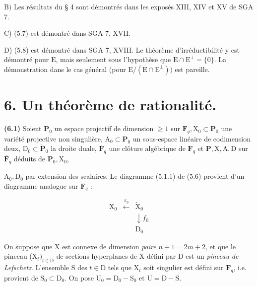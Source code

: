\documentclass[10pt,leqno]{article}
\begin{document}
\noindent \(\mathrm{B})\) Les résultats du § 4 sont démontrés dans les exposés XIII, XIV et XV de SGA 7.\par

\noindent C) (5.7) est démontré dans SGA 7, XVII.\par

\noindent D) (5.8) est démontré dans SGA 7, XVIII. Le théorème d’irréductibilité y est démontré pour \(\mathrm{E}\), mais seulement sous l’hypothèse que \(\mathrm{E}\cap \mathrm{E}^{\perp }=\{0\}\). La démonstration dans le cas général (pour \(\mathrm{E}/(\mathrm{E}\cap \mathrm{E}^{\perp }))\) est pareille.\par

\section*{6. Un théorème de rationalité.}

\noindent \textbf{(6.1)} Soient \(\mathbf{P}_{0}\) un espace projectif de dimension \(\geq 1\) sur \(\mathbf{F}_{q}, \mathrm{X}_{0}\subset \mathbf{P}_{0}\) une variété projective non singulière, \(\mathrm{A}_{0}\subset \mathbf{P}_{0}\) un sous-espace linéaire de codimension deux, \(\mathrm{D}_{0}\subset \check{\mathbf{P}}_{0}\) la droite duale, \(\overline{\mathbf{F}}_{q}\) une clôture algébrique de \(\mathbf{F}_{q}\) et \(\mathbf{P}, \mathrm{X}, \mathrm{A}, \mathrm{D}\) sur \(\overline{\mathbf{F}}_{q}\) déduits de \(\mathbf{P}_{0}, \mathrm{X}_{0}\),\par

\clearpage

\label{physical-24}\par\smallskip

\noindent \(\mathrm{A}_{0}, \mathrm{D}_{0}\) par extension des scalaires. Le diagramme (5.1.1) de (5.6) provient d’un diagramme analogue sur \(\mathbf{F}_{q}\) :\par

\[\begin{array}{ccc}\mathrm X_0&\xleftarrow{\pi_0}&\widetilde{\mathrm X}_0\\ &&\downarrow\!{f_0}\\ &&\mathrm D_0\end{array}\tag{6.1.1}\]

\noindent On suppose que \(\mathrm{X}\) est connexe de dimension \emph{paire} \(n+1=2m+2\), et que le pinceau (\(\mathrm{X}_{t})_{t\in \mathrm{D}}\) de sections hyperplanes de \(\mathrm{X}\) défini par \(\mathrm{D}\) est un \emph{pinceau de Lefschetz}. L’ensemble \(\mathrm{S}\) des \(t\in \mathrm{D}\) tels que \(\mathrm{X}_{t}\) soit singulier est défini sur \(\mathbf{F}_{q}\), i.e. provient de \(\mathrm{S}_{0}\subset \mathrm{D}_{0}\). On pose \(\mathrm{U}_{0}=\mathrm{D}_{0}- \mathrm{S}_{0}\) et \(\mathrm{U}=\mathrm{D}- \mathrm{S}\).\par
\end{document}
